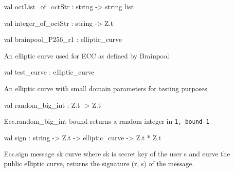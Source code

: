\documentclass[11pt]{article}
\begin{document}
\begin{ocamldocsigend}
\label{val:Ecc.Ecc.octList-underscoreof-underscoreoctStr}\begin{ocamldoccode}
val octList_of_octStr : string -> string list
\end{ocamldoccode}


\label{val:Ecc.Ecc.integer-underscoreof-underscoreoctStr}\begin{ocamldoccode}
val integer_of_octStr : string -> Z.t
\end{ocamldoccode}


\label{val:Ecc.Ecc.brainpool-underscoreP256-underscorer1}\begin{ocamldoccode}
val brainpool_P256_r1 : elliptic_curve
\end{ocamldoccode}
\begin{ocamldocdescription}
An elliptic curve used for ECC as defined by Brainpool


\end{ocamldocdescription}


\label{val:Ecc.Ecc.test-underscorecurve}\begin{ocamldoccode}
val test_curve : elliptic_curve
\end{ocamldoccode}
\begin{ocamldocdescription}
An elliptic curve with small domain parameters for testing purposes


\end{ocamldocdescription}


\label{val:Ecc.Ecc.random-underscorebig-underscoreint}\begin{ocamldoccode}
val random_big_int : Z.t -> Z.t
\end{ocamldoccode}
\begin{ocamldocdescription}
Ecc.random\_big\_int bound returns a random integer in {\tt{1, bound-1}}


\end{ocamldocdescription}


\label{val:Ecc.Ecc.sign}\begin{ocamldoccode}
val sign : string -> Z.t -> elliptic_curve -> Z.t * Z.t
\end{ocamldoccode}
\begin{ocamldocdescription}
Ecc.sign message sk curve where sk is secret key of the user s and curve 
       the public elliptic curve, returns the signature (r, s) of the message.



\end{ocamldocdescription}
\end{ocamldocsigend}
\end{document}
